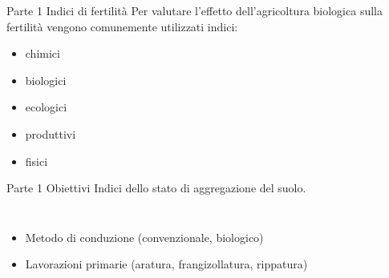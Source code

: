 \documentclass[10pt]{beamer}
\begin{document}
\begin{frame}{Parte 1 \small{Indici di fertilità}}
  Per valutare l'effetto dell'agricoltura biologica sulla fertilità
  vengono comunemente utilizzati indici:
\begin{itemize}[<+->]
\pause
\item chimici
\item biologici
\item ecologici
\item produttivi
\item \Large{fisici} 
\end{itemize}
  
\end{frame}



\begin{frame}{Parte 1 \small{Obiettivi}}
  Indici dello stato di aggregazione del suolo. 
  \begin{columns}[c]
    \begin{itemize}[<+->]
      \pause
    \item Metodo di conduzione (convenzionale, biologico) 

    \item Lavorazioni primarie (aratura, frangizollatura, rippatura)
    \end{itemize}
  \end{columns}
\end{frame}
\end{document}
